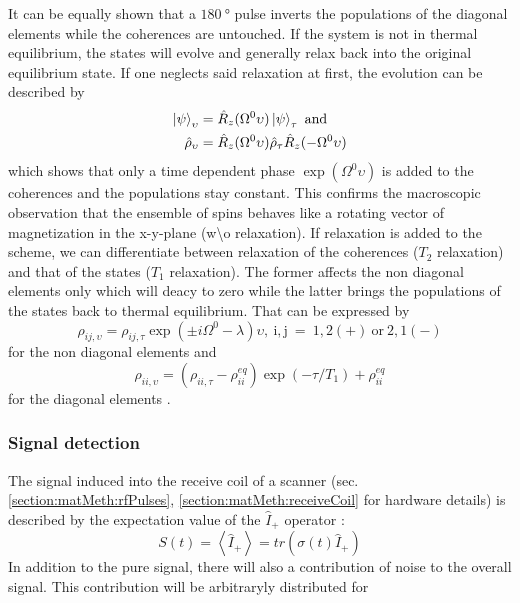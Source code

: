             It can be equally shown that a $\SI{180}{\degree}$ pulse inverts the populations of the
            diagonal elements while the coherences are untouched.
            If the system is not in thermal equilibrium, the states will evolve and generally relax back
            into the original equilibrium state. If one neglects said relaxation at first, the evolution
            can be described by 
            \begin{equation}
                \begin{split}
                    \ket\psi_\upsilon &= \hat R_z(\Omega^0\upsilon)\ket\psi_\tau ~ \mathrm{and} \\
                    \hat\rho_\upsilon &= \hat R_z(\Omega^0\upsilon)\hat\rho_\tau\hat
                    R_z(-\Omega^0\upsilon)
                \end{split}
            \end{equation}
            which shows that only a time dependent phase $\exp{(\Omega^0 \upsilon)}$ is added to the coherences and the populations
            stay constant. This confirms the macroscopic observation that the ensemble of spins behaves like a rotating vector of
            magnetization in the x-y-plane (w\textbackslash o relaxation).
            If relaxation is added to the scheme, we can differentiate between relaxation of the
            coherences ($T_2$ relaxation) and that of the states ($T_1$ relaxation). The former affects
            the non diagonal elements only which will deacy to zero while the latter brings the populations of the states back to
            thermal equilibrium. That can be expressed by
            \begin{equation}
                \rho_{ij, \upsilon} = \rho_{ij, \tau} \exp{(\pm
                    i\Omega^0-\lambda)\upsilon},~\mathrm{i,j~=~
                1,2(+)~or~2,1(-)}
            \end{equation}
            for the non diagonal elements and
            \begin{equation}
                \rho_{ii,\upsilon} = (\rho_{ii,\tau} - \rho_{ii}^{eq})\exp(-\tau/T_1)+\rho_{ii}^{eq}
            \end{equation}
            for the diagonal elements \cite{levitt_spin_nodate}.
        \subsubsection{Signal detection}
        The signal induced into the receive coil of a scanner (sec. \ref{section:matMeth:rfPulses}, \ref{section:matMeth:receiveCoil} for hardware details) is described by the expectation value of the $\hat{I}_+$ operator \cite{levitt_spin_nodate}:
        \begin{equation}
            S(t) = \left< \hat{I}_+ \right> = tr\left(\sigma(t)\hat{I}_+\right)
        \end{equation}
        In addition to the pure signal, there will also a contribution of noise to the overall signal. This contribution will be arbitraryly distributed for 
